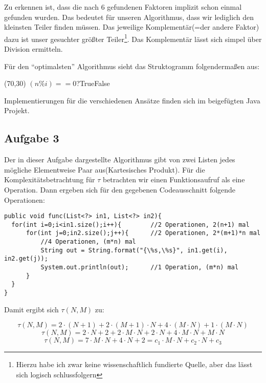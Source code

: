 \documentclass[a4paper,
			   fontsize=12pt]{article}
\begin{document}
Zu erkennen ist, dass die nach $6$ gefundenen Faktoren implizit schon einmal gefunden wurden. Das bedeutet für unseren Algorithmus, dass wir lediglich den kleinsten Teiler finden müssen. Das jeweilige Komplementär(=der andere Faktor) dazu
ist unser gesuchter größter Teiler\footnote{Hierzu habe ich zwar keine wissenschaftlich fundierte Quelle, aber das lässt sich logisch schlussfolgern}. Das Komplementär lässt sich simpel über Division ermitteln.

Für den "`optimalsten"' Algorithmus sieht das Struktogramm folgendermaßen aus:

\begin{centernss}
    \begin{struktogramm}(70,30)
            { \( (n\%i)==0 \)?}{True}{False}
        \change
        \ifend
        \whileend
    \end{struktogramm}
\end{centernss}

Implementierungen für die verschiedenen Ansätze finden sich im beigefügten Java Projekt.

\vspace{0,75cm}

\subsection*{Aufgabe 3}
Der in dieser Aufgabe dargestellte Algorithmus gibt von zwei Listen jedes mögliche Elementweise Paar aus(Kartesisches Produkt). Für die Komplexitätsbetrachtung für $\tau$ betrachten wir einen Funktionsaufruf als eine Operation. Dann ergeben sich
für den gegebenen Codeausschnitt folgende Operationen:

\lstset{style=java}
\begin{lstlisting}
public void func(List<?> in1, List<?> in2){
  for(int i=0;i<in1.size();i++){		//2 Operationen, 2(n+1) mal
      for(int j=0;in2.size();j++){		//2 Operationen, 2*(m+1)*n mal
		  //4 Operationen, (m*n) mal
          String out = String.format("{\%s,\%s}", in1.get(i), in2.get(j));
          System.out.println(out);		//1 Operation, (m*n) mal
      }
  }
}
\end{lstlisting}

Damit ergibt sich $\tau(N,M)$ zu:

$$\tau(N,M)=2\cdot (N+1) + 2\cdot (M+1)\cdot N + 4 \cdot (M\cdot N)+ 1 \cdot (M\cdot N)$$
$$\tau(N,M)=2\cdot N+2 + 2\cdot M\cdot N +2\cdot N + 4 \cdot M\cdot N+ M\cdot N$$
$$\tau(N,M)=7\cdot M\cdot N +4\cdot N + 2=c_1\cdot M \cdot N + c_2\cdot N + c_3$$
\end{document}
